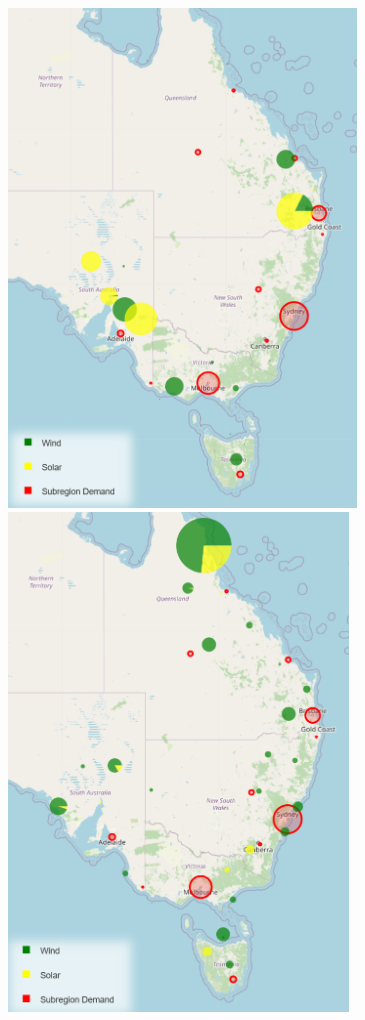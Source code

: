 \documentclass[
  letterpaper,
  DIV=11,
  numbers=noendperiod]{scrartcl}
\begin{document}
\includegraphics[width=3.63472in,height=5.20556in]{./media/media/image3.png}
\includegraphics[width=3.55in,height=5.20972in]{./media/media/image5.png}
\end{document}
